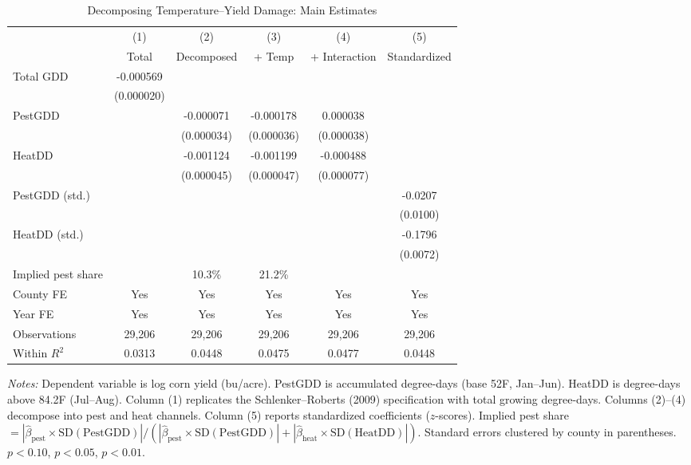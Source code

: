 \begin{table}[htbp]
\centering
\begin{threeparttable}
\caption{Decomposing Temperature--Yield Damage: Main Estimates}
\label{tab:main}
\small
\begin{tabular}{lccccc}
\toprule
 & (1) & (2) & (3) & (4) & (5) \\
 & Total & Decomposed & + Temp & + Interaction & Standardized \\
\midrule
Total GDD & -0.000569\sym{***} & & & & \\
 & (0.000020) & & & & \\
PestGDD & & -0.000071\sym{**} & -0.000178\sym{***} & 0.000038 & \\
 & & (0.000034) & (0.000036) & (0.000038) & \\
HeatDD & & -0.001124\sym{***} & -0.001199\sym{***} & -0.000488\sym{***} & \\
 & & (0.000045) & (0.000047) & (0.000077) & \\
PestGDD (std.) & & & & & -0.0207\sym{**} \\
 & & & & & (0.0100) \\
HeatDD (std.) & & & & & -0.1796\sym{***} \\
 & & & & & (0.0072) \\
\midrule
Implied pest share & & 10.3\% & 21.2\% & & \\
County FE & Yes & Yes & Yes & Yes & Yes \\
Year FE & Yes & Yes & Yes & Yes & Yes \\
Observations & 29,206 & 29,206 & 29,206 & 29,206 & 29,206 \\
Within $R^2$ & 0.0313 & 0.0448 & 0.0475 & 0.0477 & 0.0448 \\
\bottomrule
\end{tabular}
\begin{tablenotes}[flushleft]
\footnotesize
\item \textit{Notes:} Dependent variable is log corn yield (bu/acre). PestGDD is accumulated degree-days (base 52\textdegree{}F, Jan--Jun). HeatDD is degree-days above 84.2\textdegree{}F (Jul--Aug). Column (1) replicates the Schlenker--Roberts (2009) specification with total growing degree-days. Columns (2)--(4) decompose into pest and heat channels. Column (5) reports standardized coefficients ($z$-scores). Implied pest share $= |\hat{\beta}_{\text{pest}} \times \text{SD}(\text{PestGDD})| / (|\hat{\beta}_{\text{pest}} \times \text{SD}(\text{PestGDD})| + |\hat{\beta}_{\text{heat}} \times \text{SD}(\text{HeatDD})|)$. Standard errors clustered by county in parentheses. \sym{*} $p<0.10$, \sym{**} $p<0.05$, \sym{***} $p<0.01$.
\end{tablenotes}
\end{threeparttable}
\end{table}
